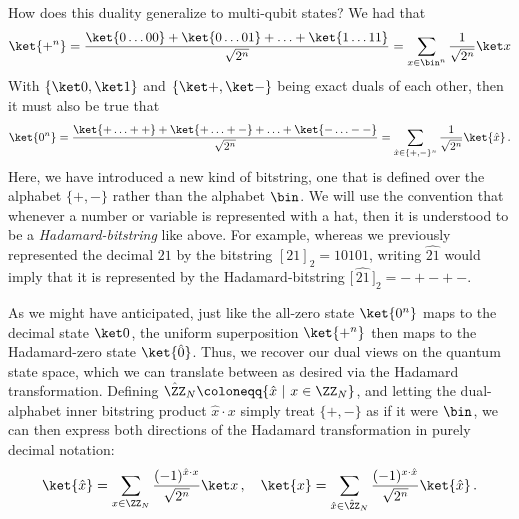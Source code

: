       How does this duality generalize to multi-qubit states?
        We had that
        \[
          \ket{+^n} 
          = \frac{\ket{0 \ldots 00} + \ket{0 \ldots 01} + \ldots + \ket{1 \ldots 11}}{\sqrt{2^n}}
          = \sum_{x \in \bin^n} \frac{1}{\sqrt{2^n}}\ket x
        \]
        With $\{\ket 0, \ket 1\}$ and $\{\ket +, \ket -\}$ being exact duals of
        each other, then it must also be true that 
        \[
          \ket{0^n} 
          = \frac{\ket{+ \ldots ++} + \ket{+ \ldots +-} + \ldots + \ket{- \ldots --}}{\sqrt{2^n}}
          = \sum_{\hat{x} \in \{+,-\}^n} \frac{1}{\sqrt{2^n}} \ket{\hat x}\, .
        \]
        Here, we have introduced a new kind of bitstring, one that is defined
        over the alphabet $\{+, -\}$ rather than the alphabet $\bin$. We will use the
        convention that whenever a number or variable is represented with a hat,
        then it is understood to be a \emph{Hadamard-bitstring} like above. For example,
        whereas we previously represented the decimal $21$ by the bitstring
        $[21]_2 = 10101$, writing $\widehat{21}$ would imply that it is
        represented by the Hadamard-bitstring $\big[\, \widehat{21}\, \big]_2 = -+-+-$. 

      As we might have anticipated, just like the all-zero state $\ket{0^n}$
        maps to the decimal state $\ket 0$, 
        the uniform superposition $\ket{+^n}$
        then maps to the Hadamard-zero state $\ket{\hat 0}$.
        Thus, we recover our dual views on the quantum
        state space, which we can translate between as desired via the Hadamard
        transformation. Defining $\hat{\ZZ}_N \coloneqq \{ \hat{x}\ |\ x \in
        \ZZ_N\}$, and letting the dual-alphabet inner bitstring product
        $\hat x \cdot x$ simply treat $\{+,-\}$ as if it were $\bin$,
        we can then express both directions of the Hadamard transformation in
        purely decimal notation:
        \[
          \ket{\hat x} = \sum_{x \in \ZZ_N} 
          \frac{(-1)^{\hat x \cdot x}}{\sqrt{2^n}} \ket x\, ,
          \quad
          \ket{x} = \sum_{\hat x \in \hat{\ZZ}_N} \frac{(-1)^{x \cdot
          \hat x}}{\sqrt{2^n}} \ket{\hat{x}}\, .
        \]
        

